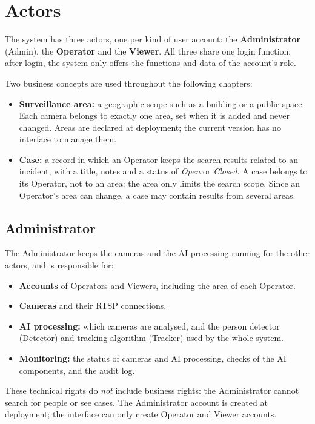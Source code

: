 \section{Actors}
\label{sec:4.1}

The system has three actors, one per kind of user account: the \textbf{Administrator} (Admin), the \textbf{Operator} and the \textbf{Viewer}. All three share one login function; after login, the system only offers the functions and data of the account's role.

Two business concepts are used throughout the following chapters:
\begin{itemize}
    \item \textbf{Surveillance area:} a geographic scope such as a building or a public space. Each camera belongs to exactly one area, set when it is added and never changed. Areas are declared at deployment; the current version has no interface to manage them.
    \item \textbf{Case:} a record in which an Operator keeps the search results related to an incident, with a title, notes and a status of \emph{Open} or \emph{Closed}. A case belongs to its Operator, not to an area: the area only limits the search scope. Since an Operator's area can change, a case may contain results from several areas.
\end{itemize}

\subsection{Administrator}
\label{sec:4.1.1}

The Administrator keeps the cameras and the AI processing running for the other actors, and is responsible for:
\begin{itemize}
    \item \textbf{Accounts} of Operators and Viewers, including the area of each Operator.
    \item \textbf{Cameras} and their RTSP connections.
    \item \textbf{AI processing:} which cameras are analysed, and the person detector (Detector) and tracking algorithm (Tracker) used by the whole system.
    \item \textbf{Monitoring:} the status of cameras and AI processing, checks of the AI components, and the audit log.
\end{itemize}
These technical rights do \emph{not} include business rights: the Administrator cannot search for people or see cases. The Administrator account is created at deployment; the interface can only create Operator and Viewer accounts.

